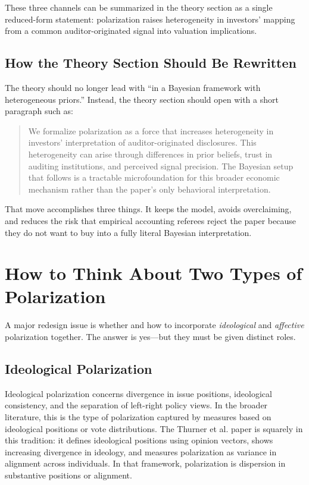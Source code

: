 \documentclass[12pt]{article}
\begin{document}
These three channels can be summarized in the theory section as a single reduced-form statement: polarization raises heterogeneity in investors' mapping from a common auditor-originated signal into valuation implications.

\subsection{How the Theory Section Should Be Rewritten}

The theory should no longer lead with ``in a Bayesian framework with heterogeneous priors.'' Instead, the theory section should open with a short paragraph such as:

\begin{quote}
We formalize polarization as a force that increases heterogeneity in investors' interpretation of auditor-originated disclosures. This heterogeneity can arise through differences in prior beliefs, trust in auditing institutions, and perceived signal precision. The Bayesian setup that follows is a tractable microfoundation for this broader economic mechanism rather than the paper's only behavioral interpretation.
\end{quote}

That move accomplishes three things. It keeps the model, avoids overclaiming, and reduces the risk that empirical accounting referees reject the paper because they do not want to buy into a fully literal Bayesian interpretation.

\section{How to Think About Two Types of Polarization}

A major redesign issue is whether and how to incorporate \emph{ideological} and \emph{affective} polarization together. The answer is yes---but they must be given distinct roles.

\subsection{Ideological Polarization}

Ideological polarization concerns divergence in issue positions, ideological consistency, and the separation of left-right policy views. In the broader literature, this is the type of polarization captured by measures based on ideological positions or vote distributions. The Thurner et al. paper is squarely in this tradition: it defines ideological positions using opinion vectors, shows increasing divergence in ideology, and measures polarization as variance in alignment across individuals. In that framework, polarization is dispersion in substantive positions or alignment. \cite{thurner2025}
\end{document}

